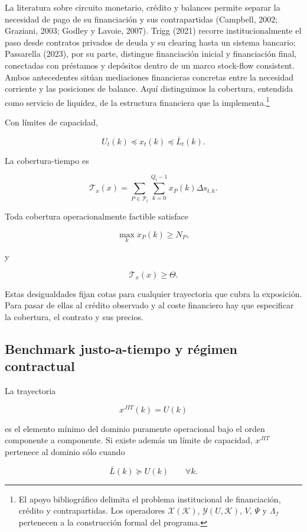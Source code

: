 \documentclass[10pt,a5paper,twoside]{article}
\begin{document}
La literatura sobre circuito monetario, crédito y balances permite separar
la necesidad de pago de su financiación y sus contrapartidas (Campbell, 2002;
Graziani, 2003; Godley y Lavoie, 2007). Trigg (2021) recorre institucionalmente el paso desde contratos privados de
deuda y su clearing hasta un sistema bancario; Passarella (2023), por su
parte, distingue financiación inicial y financiación final, conectadas con
préstamos y depósitos dentro de un marco stock-flow consistent. Ambos antecedentes sitúan mediaciones financieras concretas entre la
necesidad corriente y las posiciones de balance. Aquí distinguimos la
cobertura, entendida como servicio de liquidez, de la estructura financiera
que la implementa.\footnote{El apoyo bibliográfico
  delimita el problema institucional de financiación, crédito y
  contrapartidas. Los operadores \(\mathcal X(\mathcal K)\),
  \(\mathcal Y(U,\mathcal K)\), \(V\), \(\Psi\) y
  \(\Lambda_{\mathcal I}\) pertenecen a la construcción formal del
  programa.}

Con límites de capacidad,

\[
U_t(k)\preceq x_t(k)\preceq\bar L_t(k).
\]

La cobertura-tiempo es

\[
\mathcal T_x(x)
=
\sum_{P\in\mathcal P_t}
\sum_{k=0}^{Q_t-1}
x_P(k)\Delta s_{t,k}.
\]

Toda cobertura operacionalmente factible satisface

\[
\max_k x_P(k)\ge N_P,
\]

y

\[
\mathcal T_x(x)\ge\Theta.
\]

Estas desigualdades fijan cotas para cualquier trayectoria que cubra la
exposición. Para pasar de ellas al crédito observado y al coste financiero
hay que especificar la cobertura, el contrato y sus precios.

\subsection{Benchmark justo-a-tiempo y régimen contractual}\label{benchmark-justo-a-tiempo-y-ruxe9gimen-contractual}

La trayectoria

\[
x^{JIT}(k)=U(k)
\]

es el elemento mínimo del dominio puramente operacional bajo el orden
componente a componente. Si existe además un límite de capacidad,
\(x^{JIT}\) pertenece al dominio sólo cuando

\[
\bar L(k)\succeq U(k)
\qquad
\forall k.
\]
\end{document}
